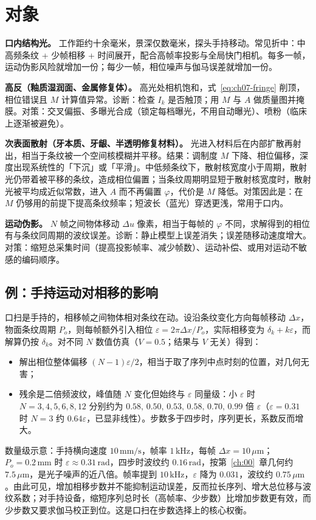 \section{对象}
\label{sec:ch06-object}

\textbf{口内结构光。} 工作距约十余毫米，景深仅数毫米，探头手持移动。常见折中：中高频条纹 + 少帧相移 + 时间展开，配合高帧率投影与全局快门相机。每多一帧，运动伪影风险就增加一份；每少一帧，相位噪声与伽马误差就增加一份。

\textbf{高反（釉质湿润面、金属修复体）。} 高光处相机饱和，式~\eqref{eq:ch07-fringe} 削顶，相位错误且 $M$ 计算值异常。诊断：检查 $I_k$ 是否触顶；用 $M$ 与 $A$ 做质量图并掩膜。对策：交叉偏振、多曝光合成（锁定每档曝光，不用自动曝光）、喷粉（临床上逐渐被避免）。

\textbf{次表面散射（牙本质、牙龈、半透明修复材料）。} 光进入材料后在内部扩散再射出，相当于条纹被一个空间核模糊并平移。结果：调制度 $M$ 下降、相位偏移，深度出现系统性的「下沉」或「平滑」。中低频条纹下，散射核宽度小于周期，散射光仍带着被平移的条纹，造成相位偏置；当条纹周期明显短于散射核宽度时，散射光被平均成近似常数，进入 $A$ 而不再偏置 $\varphi$，代价是 $M$ 降低。对策因此是：在 $M$ 仍够用的前提下提高条纹频率；短波长（蓝光）穿透更浅，常用于口内。

\textbf{运动伪影。} $N$ 帧之间物体移动 $\Delta u$ 像素，相当于每帧的 $\varphi$ 不同，求解得到的相位有与条纹同周期的波纹误差。诊断：静止模型上误差消失；误差随移动速度增大。对策：缩短总采集时间（提高投影帧率、减少帧数）、运动补偿、或用对运动不敏感的编码顺序。

\subsection{例：手持运动对相移的影响}

口扫是手持的，相移帧之间物体相对条纹在动。设沿条纹变化方向每帧移动 $\Delta x$，物面条纹周期 $P_o$，则每帧额外引入相位 $\varepsilon=2\pi\Delta x/P_o$，实际相移变为 $\delta_k+k\varepsilon$，而解算仍按 $\delta_k$。对不同 $N$ 数值仿真（$V=0.5$；结果与 $V$ 无关）得到：
\begin{itemize}
  \item 解出相位整体偏移 $(N-1)\varepsilon/2$，相当于取了序列中点时刻的位置，对几何无害；
  \item 残余是二倍频波纹，峰值随 $N$ 变化但始终与 $\varepsilon$ 同量级：小 $\varepsilon$ 时 $N=3,4,5,6,8,12$ 分别约为 $0.58,\,0.50,\,0.53,\,0.58,\,0.70,\,0.99$ 倍 $\varepsilon$（$\varepsilon=0.31$ 时 $N=3$ 约 $0.64\varepsilon$，已显非线性）。步数多于四步时，序列更长，系数反而增大。
\end{itemize}
数量级示意：手持横向速度 $10\,\mathrm{mm/s}$，帧率 $1\,\mathrm{kHz}$，每帧 $\Delta x=10\,\mu\mathrm{m}$；$P_o=0.2\,\mathrm{mm}$ 时 $\varepsilon\approx0.31\,\mathrm{rad}$，四步时波纹约 $0.16\,\mathrm{rad}$，按第~\ref{ch:00}~章几何约 $7.5\,\mu\mathrm{m}$，是光子噪声的近八倍。帧率提到 $10\,\mathrm{kHz}$，$\varepsilon$ 降为 $0.031$，波纹约 $0.75\,\mu\mathrm{m}$。由此可见，增加相移步数并不能抑制运动误差，反而拉长序列、增大总位移与波纹系数；对手持设备，缩短序列总时长（高帧率、少步数）比增加步数更有效，而少步数又要求伽马校正到位。这是口扫在步数选择上的核心权衡。

